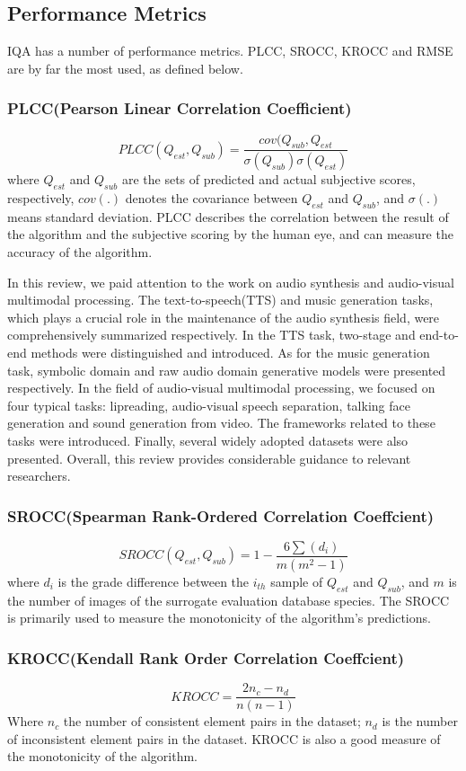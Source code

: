 \documentclass{article}
\begin{document}
\subsection{Performance Metrics}
\label{PM}
IQA has a number of performance metrics. PLCC, SROCC, KROCC and RMSE are by far the most used, as defined below.
\subsubsection{PLCC(Pearson Linear Correlation Coefficient)}
\label{PLCC}
$$PLCC(Q_{est},Q_{sub})=\frac{cov(Q_{sub},Q_{est}}{\sigma(Q_{sub})\sigma(Q_{est})}$$
where $Q_{est}$ and $Q_{sub}$ are the sets of predicted and actual subjective scores, respectively, $cov(.)$ denotes the covariance between $Q_{est}$ and $Q_{sub}$, and $\sigma(.)$means standard deviation. PLCC describes the correlation between the result of the algorithm and the subjective scoring by the human eye, and can measure the accuracy of the algorithm.

In this review, we paid attention to the work on audio synthesis and audio-visual multimodal processing. The text-to-speech(TTS) and music generation tasks, which plays a crucial role in the maintenance of the audio synthesis field, were comprehensively summarized respectively. In the TTS task, two-stage and end-to-end methods were distinguished and introduced. As for the music generation task, symbolic domain and raw audio domain generative models were presented respectively. In the field of audio-visual multimodal processing, we focused on four typical tasks: lipreading, audio-visual speech separation, talking face generation and sound generation from video. The frameworks related to these tasks were introduced. Finally, several widely adopted datasets were also presented. Overall, this review provides considerable guidance to relevant researchers.
\subsubsection{SROCC(Spearman Rank-Ordered Correlation Coeffcient)}
\label{SROCC}
$$SROCC(Q_{est},Q_{sub})=1-\frac{6\sum(d_i)}{m(m^2-1)}$$
where $d_i$ is the grade difference between the $i_{th}$ sample of $Q_{est}$ and $Q_{sub}$, and $m$ is the number of images of the surrogate evaluation database species. The SROCC is primarily used to measure the monotonicity of the algorithm's predictions.

\subsubsection{KROCC(Kendall Rank Order Correlation Coeffcient)}
\label{KROCC}
$$KROCC=\frac{2n_c-n_d}{n(n-1)}$$
Where $n_c$ the number of consistent element pairs in the dataset; $n_d$ is the number of inconsistent element pairs in the dataset. KROCC is also a good measure of the monotonicity of the algorithm.
\end{document}
